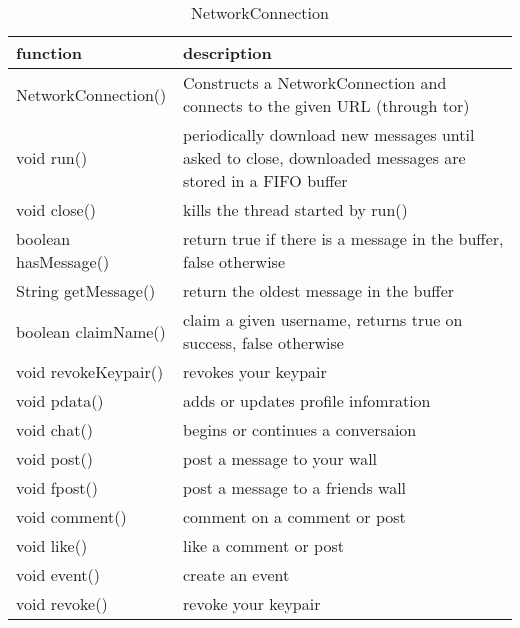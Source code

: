 \begin{table}[h]
    \centering
    \begin{tabular}{p{3.6cm}p{9cm}}
    function             & description\\ \hline
    NetworkConnection()  & Constructs a NetworkConnection and connects to the given URL (through tor)\\
    void run()           & periodically download new messages until asked to close, downloaded messages are stored in a FIFO buffer\\
    void close()         & kills the thread started by run()\\
    boolean hasMessage() & return true if there is a message in the buffer, false otherwise\\
    String getMessage()  & return the oldest message in the buffer\\
    
    boolean claimName()  & claim a given username, returns true on success, false otherwise\\
    void revokeKeypair() & revokes your keypair\\
    void pdata()         & adds or updates profile infomration\\
    void chat()          & begins or continues a conversaion\\
    void post()          & post a message to your wall\\
    void fpost()         & post a message to a friends wall\\
    void comment()       & comment on a comment or post\\
    void like()          & like a comment or post\\
    void event()         & create an event\\
    void revoke()        & revoke your keypair\\
    \end{tabular}
    \caption{NetworkConnection}
\end{table}

